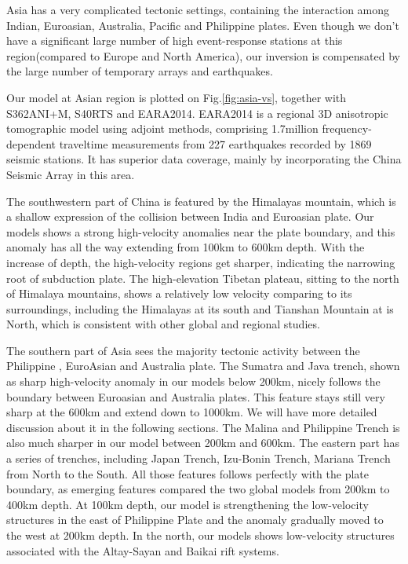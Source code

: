 \documentclass[extra,mreferee]{gji}
\begin{document}
Asia has a very complicated tectonic settings, containing
the interaction among Indian, Euroasian, Australia, Pacific and Philippine
plates. Even though we don't have a significant large number of high
event-response stations at this region(compared to Europe and North
America), our inversion is compensated by the large number of temporary
arrays and earthquakes.

Our model at Asian region is plotted on Fig.\ref{fig:asia-vs},
together with S362ANI+M, S40RTS and EARA2014\cite{chen2015multiparameter}.
EARA2014 is a regional 3D anisotropic tomographic model using adjoint
methods, comprising 1.7million frequency-dependent traveltime
measurements from 227 earthquakes recorded by 1869 seismic stations.
It has superior data coverage, mainly by incorporating the China
Seismic Array in this area.

The southwestern part of China is featured by the Himalayas mountain,
which is 
a shallow expression of the collision between India and Euroasian plate. Our
models shows a strong high-velocity anomalies near the plate boundary, and this
anomaly has all the way extending from 100km to 600km depth. With the increase
of depth, the high-velocity regions get sharper, indicating the narrowing
root of subduction plate. The high-elevation Tibetan plateau, sitting to
the north of Himalaya mountains, shows a relatively low velocity
comparing to its surroundings, including the Himalayas at its south and
Tianshan Mountain at is North, which is consistent with other global
and regional studies.

The southern part of Asia sees the majority tectonic activity between the Philippine
, EuroAsian and Australia plate. The Sumatra and Java trench, shown as sharp high-velocity
anomaly in our models below 200km, nicely follows the boundary between Euroasian
and Australia plates. This feature stays still very sharp at the 600km and extend
down to 1000km. We will have more detailed discussion about it in the following sections.
The Malina and Philippine Trench is also much sharper in our model between 200km and
600km.
The eastern part has a series of trenches, including Japan Trench, Izu-Bonin Trench,
Mariana Trench from North to the South. All those features follows perfectly with
the plate boundary, as emerging features compared the two global models from 200km
to 400km depth. At 100km depth, our model is strengthening the low-velocity structures
in the east of Philippine Plate and the anomaly gradually moved to the west at 200km
depth. In the north, our models shows low-velocity structures associated
with the Altay-Sayan and Baikai rift systems.
\end{document}
